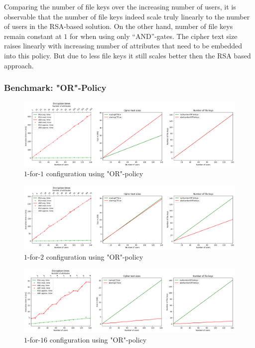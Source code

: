 Comparing the number of file keys over the increasing number of users, it is observable that the number of file keys indeed scale truly linearly to the number of users in the RSA-based solution. On the other hand, number of file keys remain constant at $1$ for \name when using only “AND”-gates. The cipher text size raises linearly with increasing number of attributes that need to be embedded into this policy. But due to less file keys it still scales better then the RSA based approach. 

\subsubsection{Benchmark: "OR"-Policy}
\begin{figure}[!t]
\centering
    \includegraphics[width=\linewidth]{img/eval-or-policy/encrypt_incrementing_10_attribute_increment_1per1User.png}
    \caption{$1$-for-$1$ configuration using "OR"-policy}
    \label{fig:1-for-1-or}
\end{figure}
\begin{figure}[!t]
\centering
    \includegraphics[width=\linewidth]{img/eval-or-policy/encrypt_incrementing_10_attribute_increment_1per2User.png}
    \caption{$1$-for-$2$ configuration using "OR"-policy}
    \label{fig:1-for-2-or}
\end{figure}
\begin{figure}[!t]
\centering
    \includegraphics[width=\linewidth]{img/eval-or-policy/encrypt_incrementing_10_attribute_increment_1per16User.png}
    \caption{$1$-for-$16$ configuration using "OR"-policy}
    \label{fig:1-for-16-or}
\end{figure}
